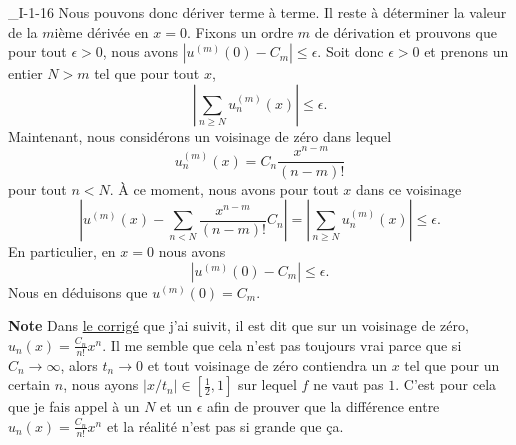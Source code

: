 \begin{corrige}{_I-1-16}
	Nous pouvons donc dériver terme à terme. Il reste à déterminer la valeur de la $m$ième dérivée en $x=0$. Fixons un ordre $m$ de dérivation et prouvons que pour tout $\epsilon>0$, nous avons $| u^{(m)}(0)-C_m |\leq \epsilon$. Soit donc $\epsilon>0$ et prenons un entier $N>m$ tel que pour tout $x$,
	\begin{equation}
		\left| \sum_{n\geq N}u_n^{(m)}(x) \right| \leq \epsilon.
	\end{equation}
	Maintenant, nous considérons un voisinage de zéro dans lequel
	\begin{equation}
		u_n^{(m)}(x)=C_n\frac{ x^{n-m} }{ (n-m)! }
	\end{equation}
	pour tout $n<N$. À ce moment, nous avons pour tout $x$ dans ce voisinage
	\begin{equation}
		\left| u^{(m)}(x)-\sum_{n<N}\frac{ x^{n-m} }{ (n-m)! }C_n \right| =\left| \sum_{n\geq N}u_n^{(m)}(x) \right| \leq\epsilon.
	\end{equation}
	En particulier, en $x=0$ nous avons
	\begin{equation}
		| u^{(m)}(0)-C_m |\leq\epsilon.
	\end{equation}
	Nous en déduisons que $u^{(m)}(0)=C_m$.


		{\bf Note} Dans \href{http://www.bibmath.net/exercices/bde/analyse/distrib/testcor.pdf}{le corrigé} que j'ai suivit, il est dit que sur un voisinage de zéro, $u_n(x)=\frac{ C_n }{ n! }x^n$. Il me semble que cela n'est pas toujours vrai parce que si $C_n\to\infty$, alors $t_n\to 0$ et tout voisinage de zéro contiendra un $x$ tel que pour un certain $n$, nous ayons $|x/t_n|\in [\frac{ 1 }{2},1]$ sur lequel $f$ ne vaut pas $1$. C'est pour cela que je fais appel à un $N$ et un $\epsilon$ afin de prouver que la différence entre $u_n(x)=\frac{ C_n }{ n! }x^n$ et la réalité n'est pas si grande que ça.

\end{corrige}
